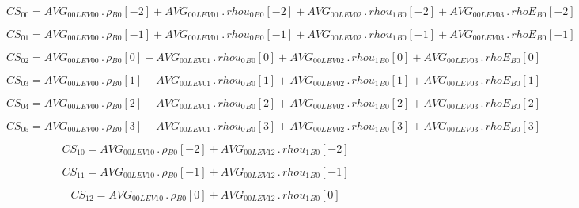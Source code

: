 \documentclass{article}
\begin{document}
\begin{dmath}CS_{00} = AVG_{0 0 LEV 00} \,.\, {\rho{_{B0}}}[{-2}] + AVG_{0 0 LEV 01} \,.\, {rhou_{0}{_{B0}}}[{-2}] + AVG_{0 0 LEV 02} \,.\, {rhou_{1}{_{B0}}}[{-2}] + AVG_{0 0 LEV 03} \,.\, {rhoE{_{B0}}}[{-2}]\end{dmath}

\begin{dmath}CS_{01} = AVG_{0 0 LEV 00} \,.\, {\rho{_{B0}}}[{-1}] + AVG_{0 0 LEV 01} \,.\, {rhou_{0}{_{B0}}}[{-1}] + AVG_{0 0 LEV 02} \,.\, {rhou_{1}{_{B0}}}[{-1}] + AVG_{0 0 LEV 03} \,.\, {rhoE{_{B0}}}[{-1}]\end{dmath}

\begin{dmath}CS_{02} = AVG_{0 0 LEV 00} \,.\, {\rho{_{B0}}}[{0}] + AVG_{0 0 LEV 01} \,.\, {rhou_{0}{_{B0}}}[{0}] + AVG_{0 0 LEV 02} \,.\, {rhou_{1}{_{B0}}}[{0}] + AVG_{0 0 LEV 03} \,.\, {rhoE{_{B0}}}[{0}]\end{dmath}

\begin{dmath}CS_{03} = AVG_{0 0 LEV 00} \,.\, {\rho{_{B0}}}[{1}] + AVG_{0 0 LEV 01} \,.\, {rhou_{0}{_{B0}}}[{1}] + AVG_{0 0 LEV 02} \,.\, {rhou_{1}{_{B0}}}[{1}] + AVG_{0 0 LEV 03} \,.\, {rhoE{_{B0}}}[{1}]\end{dmath}

\begin{dmath}CS_{04} = AVG_{0 0 LEV 00} \,.\, {\rho{_{B0}}}[{2}] + AVG_{0 0 LEV 01} \,.\, {rhou_{0}{_{B0}}}[{2}] + AVG_{0 0 LEV 02} \,.\, {rhou_{1}{_{B0}}}[{2}] + AVG_{0 0 LEV 03} \,.\, {rhoE{_{B0}}}[{2}]\end{dmath}

\begin{dmath}CS_{05} = AVG_{0 0 LEV 00} \,.\, {\rho{_{B0}}}[{3}] + AVG_{0 0 LEV 01} \,.\, {rhou_{0}{_{B0}}}[{3}] + AVG_{0 0 LEV 02} \,.\, {rhou_{1}{_{B0}}}[{3}] + AVG_{0 0 LEV 03} \,.\, {rhoE{_{B0}}}[{3}]\end{dmath}

\begin{dmath}CS_{10} = AVG_{0 0 LEV 10} \,.\, {\rho{_{B0}}}[{-2}] + AVG_{0 0 LEV 12} \,.\, {rhou_{1}{_{B0}}}[{-2}]\end{dmath}

\begin{dmath}CS_{11} = AVG_{0 0 LEV 10} \,.\, {\rho{_{B0}}}[{-1}] + AVG_{0 0 LEV 12} \,.\, {rhou_{1}{_{B0}}}[{-1}]\end{dmath}

\begin{dmath}CS_{12} = AVG_{0 0 LEV 10} \,.\, {\rho{_{B0}}}[{0}] + AVG_{0 0 LEV 12} \,.\, {rhou_{1}{_{B0}}}[{0}]\end{dmath}
\end{document}
